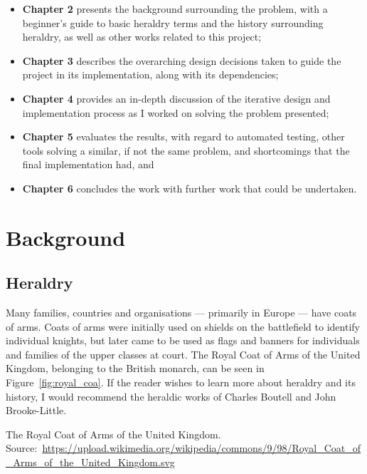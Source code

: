 \documentclass[nobib, a4paper, twoside, justified]{tufte-book}
\begin{document}
\begin{itemize}
  \item \textbf{Chapter 2} presents the background surrounding the problem, with a beginner's
    guide to basic heraldry terms and the history surrounding heraldry, as well as other works
    related to this project;
  \item \textbf{Chapter 3} describes the overarching design decisions taken to guide the project in
    its implementation, along with its dependencies;
  \item \textbf{Chapter 4} provides an in-depth discussion of the iterative design and implementation
    process as I worked on solving the problem presented;
  \item \textbf{Chapter 5} evaluates the results, with regard to automated testing, other tools
    solving a similar, if not the same problem, and shortcomings that the final implementation
    had, and
  \item \textbf{Chapter 6} concludes the work with further work that could be undertaken.
\end{itemize}

\chapter{Background}\label{cha:background}

\section{Heraldry}\label{sec:heraldry}

Many families, countries and organisations --- primarily in Europe --- have coats of arms. Coats of
arms were initially used on shields on the battlefield to identify individual knights, but later
came to be used as flags and banners for individuals and families of the upper classes at court.
The Royal Coat of Arms of the United Kingdom, belonging to the British monarch, can be seen in
Figure~\ref{fig:royal_coa}. If the reader wishes to learn more about heraldry and its history, I
would recommend the heraldic works of Charles Boutell and John Brooke-Little.

\begin{marginfigure}
  \centering
  \def\svgwidth{0.8\linewidth}
  
  \caption{The Royal Coat of Arms of the United Kingdom.
  Source:~\url{https://upload.wikimedia.org/wikipedia/commons/9/98/Royal_Coat_of_Arms_of_the_United_Kingdom.svg}}%
  \label{fig:royal_coa}
\end{marginfigure}
\end{document}
